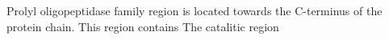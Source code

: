 Prolyl oligopeptidase family region is located towards the C-terminus of the protein chain. This region contains The catalitic region 
